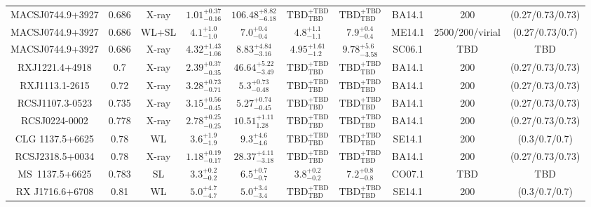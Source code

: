 \begin{table}
\begin{tabular}{cccccccccc}
MACSJ0744.9+3927 & 0.686 & X-ray & ${1.01}^{+0.37}_{-0.16}$ & ${106.48}^{+8.82}_{-6.18}$ & ${\mathrm{TBD}}^{+\mathrm{TBD}}_{\mathrm{TBD}}$ & ${\mathrm{TBD}}^{+\mathrm{TBD}}_{\mathrm{TBD}}$ & BA14.1 & 200 & (0.27/0.73/0.73) \\
MACSJ0744.9+3927 & 0.686 & WL+SL & ${4.1}^{+1.0}_{-1.0}$ & ${7.0}^{+0.4}_{-0.4}$ & ${4.8}^{+1.1}_{-1.1}$ & ${7.9}^{+0.4}_{-0.4}$ & ME14.1 & 2500/200/virial & (0.27/0.73/0.7) \\
MACSJ0744.9+3927 & 0.686 & X-ray & ${4.32}^{+1.43}_{-1.06}$ & ${8.83}^{+4.84}_{-3.16}$ & ${4.95}^{+1.61}_{-1.2}$ & ${9.78}^{+5.6}_{-3.58}$ & SC06.1 & TBD & TBD \\
RXJ1221.4+4918 & 0.7 & X-ray & ${2.39}^{+0.37}_{-0.35}$ & ${46.64}^{+5.22}_{-3.49}$ & ${\mathrm{TBD}}^{+\mathrm{TBD}}_{\mathrm{TBD}}$ & ${\mathrm{TBD}}^{+\mathrm{TBD}}_{\mathrm{TBD}}$ & BA14.1 & 200 & (0.27/0.73/0.73) \\
RXJ1113.1-2615 & 0.72 & X-ray & ${3.28}^{+0.73}_{-0.71}$ & ${5.3}^{+0.73}_{-0.48}$ & ${\mathrm{TBD}}^{+\mathrm{TBD}}_{\mathrm{TBD}}$ & ${\mathrm{TBD}}^{+\mathrm{TBD}}_{\mathrm{TBD}}$ & BA14.1 & 200 & (0.27/0.73/0.73) \\
RCSJ1107.3-0523 & 0.735 & X-ray & ${3.15}^{+0.56}_{-0.45}$ & ${5.27}^{+0.74}_{-0.45}$ & ${\mathrm{TBD}}^{+\mathrm{TBD}}_{\mathrm{TBD}}$ & ${\mathrm{TBD}}^{+\mathrm{TBD}}_{\mathrm{TBD}}$ & BA14.1 & 200 & (0.27/0.73/0.73) \\
RCSJ0224-0002 & 0.778 & X-ray & ${2.78}^{+0.25}_{-0.25}$ & ${10.51}^{+1.11}_{1.28}$ & ${\mathrm{TBD}}^{+\mathrm{TBD}}_{\mathrm{TBD}}$ & ${\mathrm{TBD}}^{+\mathrm{TBD}}_{\mathrm{TBD}}$ & BA14.1 & 200 & (0.27/0.73/0.73) \\
CLG 1137.5+6625 & 0.78 & WL & ${3.6}^{+1.9}_{-1.9}$ & ${9.3}^{+4.6}_{-4.6}$ & ${\mathrm{TBD}}^{+\mathrm{TBD}}_{\mathrm{TBD}}$ & ${\mathrm{TBD}}^{+\mathrm{TBD}}_{\mathrm{TBD}}$ & SE14.1 & 200 & (0.3/0.7/0.7) \\
RCSJ2318.5+0034 & 0.78 & X-ray & ${1.18}^{+0.19}_{-0.17}$ & ${28.37}^{+4.11}_{-3.18}$ & ${\mathrm{TBD}}^{+\mathrm{TBD}}_{\mathrm{TBD}}$ & ${\mathrm{TBD}}^{+\mathrm{TBD}}_{\mathrm{TBD}}$ & BA14.1 & 200 & (0.27/0.73/0.73) \\
MS~1137.5+6625 & 0.783 & SL & ${3.3}^{+0.2}_{-0.2}$ & ${6.5}^{+0.7}_{-0.7}$ & ${3.8}^{+0.2}_{-0.2}$ & ${7.2}^{+0.8}_{-0.8}$ & CO07.1 & TBD & TBD \\
RX J1716.6+6708 & 0.81 & WL & ${5.0}^{+4.7}_{-4.7}$ & ${5.0}^{+3.4}_{-3.4}$ & ${\mathrm{TBD}}^{+\mathrm{TBD}}_{\mathrm{TBD}}$ & ${\mathrm{TBD}}^{+\mathrm{TBD}}_{\mathrm{TBD}}$ & SE14.1 & 200 & (0.3/0.7/0.7) \\

\end{tabular}
\end{table}
